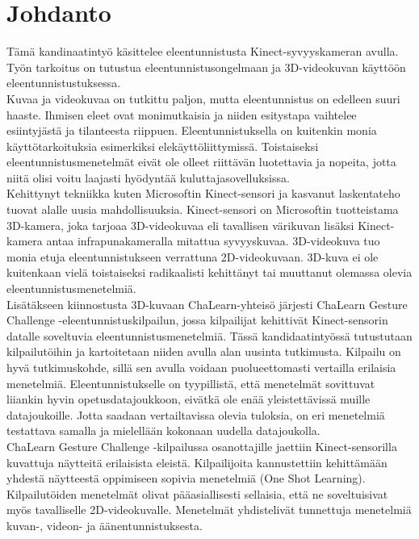 
\section{Johdanto}

Tämä kandinaatintyö käsittelee eleentunnistusta Kinect-syvyyskameran avulla. 
Työn tarkoitus on tutustua eleentunnistusongelmaan ja 3D-videokuvan käyttöön eleentunnistustuksessa. \\

Kuvaa ja videokuvaa on tutkittu paljon, mutta eleentunnistus on edelleen suuri haaste. Ihmisen eleet
ovat monimutkaisia ja niiden esitystapa vaihtelee esiintyjästä ja tilanteesta riippuen. Eleentunnistuksella
on kuitenkin monia käyttötarkoituksia esimerkiksi elekäyttöliittymissä. \citep{chalearn2} Toistaiseksi
eleentunnistusmenetelmät eivät ole olleet riittävän luotettavia ja nopeita, jotta niitä olisi voitu
laajasti hyödyntää kuluttajasovelluksissa.\\

Kehittynyt tekniikka kuten Microsoftin Kinect-sensori ja kasvanut laskentateho tuovat alalle uusia mahdollisuuksia. 
Kinect-sensori on Microsoftin tuotteistama 3D-kamera, joka tarjoaa 3D-videokuvaa eli tavallisen värikuvan 
lisäksi Kinect-kamera antaa infrapunakameralla mitattua syvyyskuvaa. \citep{kinectkuva}
3D-videokuva tuo monia etuja eleentunnistukseen verrattuna 2D-videokuvaan. 3D-kuva ei ole kuitenkaan 
vielä toistaiseksi radikaalisti kehittänyt tai muuttanut olemassa olevia eleentunnistusmenetelmiä.\\

Lisätäkseen kiinnostusta 3D-kuvaan ChaLearn-yhteisö järjesti ChaLearn Gesture Challenge -eleentunnistuskilpailun, 
jossa kilpailijat kehittivät Kinect-sensorin datalle soveltuvia 
eleentunnistusmenetelmiä. Tässä kandidaatintyössä tutustutaan kilpailutöihin ja kartoitetaan niiden avulla alan uusinta tutkimusta. 
Kilpailu on hyvä tutkimuskohde,
sillä sen avulla voidaan puolueettomasti vertailla erilaisia menetelmiä. Eleentunnistukselle on tyypillistä, 
että menetelmät sovittuvat liiankin hyvin opetusdatajoukkoon, eivätkä ole enää yleistettävissä muille datajoukoille.
Jotta saadaan vertailtavissa olevia tuloksia, on eri menetelmiä testattava samalla ja mielellään kokonaan uudella datajoukolla.\\

ChaLearn Gesture Challenge -kilpailussa osanottajille jaettiin Kinect-sensorilla kuvattuja näytteitä erilaisista eleistä.
Kilpailijoita kannustettiin kehittämään yhdestä näytteestä oppimiseen sopivia menetelmiä (One Shot Learning). 
Kilpailutöiden menetelmät olivat pääasiallisesti sellaisia, että ne soveltuisivat myös tavalliselle 2D-videokuvalle. 
Menetelmät yhdistelivät tunnettuja menetelmiä kuvan-, videon- ja äänentunnistuksesta.\\

